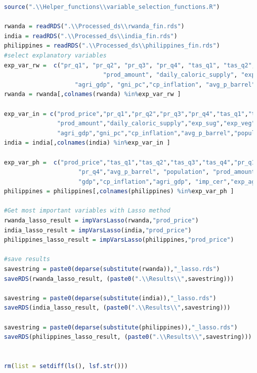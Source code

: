\documentclass[11pt]{article}
\begin{document}
\begin{lstlisting}[language= R]
source(".\\Helper_functions\\variable_selection_functions.R")

rwanda = readRDS(".\\Processed_ds\\rwanda_fin.rds")
india = readRDS(".\\Processed_ds\\india_fin.rds")
philippines = readRDS(".\\Processed_ds\\philippines_fin.rds")
#select explanatory variables
exp_var_rw =  c("pr_q1", "pr_q2", "pr_q3", "pr_q4", "tas_q1", "tas_q2", "tas_q3", "tas_q4",
                            "prod_amount", "daily_caloric_supply", "exp_veg", "exp_cer", "imp_veg", "imp_cer", 
                    "agri_gdp", "gni_pc","cp_inflation", "avg_p_barrel", "population","prod_price")
rwanda = rwanda[,colnames(rwanda) %in%exp_var_rw ]

exp_var_in = c("prod_price","pr_q1","pr_q2","pr_q3","pr_q4","tas_q1","tas_q2","tas_q3","tas_q4",
               "prod_amount","daily_caloric_supply","exp_sug","exp_veg","exp_cer","imp_sug","imp_veg","imp_cer", 
               "agri_gdp","gni_pc","cp_inflation","avg_p_barrel","population") 
india = india[,colnames(india) %in%exp_var_in ]

exp_var_ph =  c("prod_price","tas_q1","tas_q2","tas_q3","tas_q4","pr_q1","pr_q2","pr_q3",
                     "pr_q4","avg_p_barrel", "population", "prod_amount","gni_pc", "exchange_rate",
                     "gdp","cp_inflation","agri_gdp", "imp_cer","exp_agri","daily_caloric_supply")
philippines = philippines[,colnames(philippines) %in%exp_var_ph ]

#Get most important variables with Lasso method
rwanda_lasso_result = impVarsLasso(rwanda,"prod_price")
india_lasso_result = impVarsLasso(india,"prod_price")
philippines_lasso_result = impVarsLasso(philippines,"prod_price")

#save results
savestring = paste0(deparse(substitute(rwanda)),"_lasso.rds")
saveRDS(rwanda_lasso_result, (paste0(".\\Results\\",savestring)))

savestring = paste0(deparse(substitute(india)),"_lasso.rds")
saveRDS(india_lasso_result, (paste0(".\\Results\\",savestring)))

savestring = paste0(deparse(substitute(philippines)),"_lasso.rds")
saveRDS(philippines_lasso_result, (paste0(".\\Results\\",savestring)))


rm(list = setdiff(ls(), lsf.str()))
\end{lstlisting}
\end{document}
